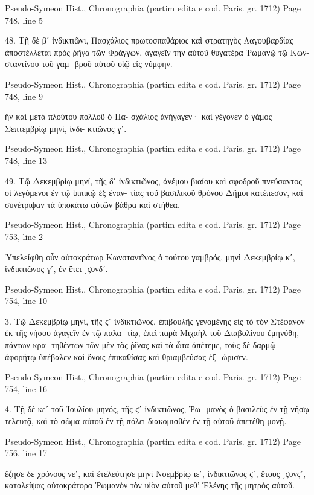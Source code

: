 \documentclass[12pt,letterpaper,twoside,final]{memoir}
\begin{document}
\begin{greek}
Pseudo-Symeon Hist., Chronographia (partim edita e cod. Paris. gr. 1712) 
Page 748, line 5

48. Τῇ δὲ βʹ ἰνδικτιῶνι, Πασχάλιος πρωτοσπαθάριος καὶ 
στρατηγὸς Λαγουβαρδίας ἀποστέλλεται πρὸς ῥῆγα τῶν Φράγγων, 
ἀγαγεῖν τὴν αὐτοῦ θυγατέρα Ῥωμανῷ τῷ Κωνσταντίνου τοῦ γαμ-
βροῦ αὐτοῦ υἱῷ εἰς νύμφην. 



Pseudo-Symeon Hist., Chronographia (partim edita e cod. Paris. gr. 1712) 
Page 748, line 9

                                   ἣν καὶ μετὰ πλούτου πολλοῦ ὁ Πα-
σχάλιος ἀνήγαγεν· καὶ γέγονεν ὁ γάμος Σεπτεμβρίῳ μηνί, ἰνδι-
κτιῶνος γʹ. 



Pseudo-Symeon Hist., Chronographia (partim edita e cod. Paris. gr. 1712) 
Page 748, line 13

49. Τῷ Δεκεμβρίῳ μηνί, τῆς δʹ ἰνδικτιῶνος, ἀνέμου 
βιαίου καὶ σφοδροῦ πνεύσαντος οἱ λεγόμενοι ἐν τῷ ἱππικῷ ἐξ ἐναν-
τίας τοῦ βασιλικοῦ θρόνου Δῆμοι κατέπεσον, καὶ συνέτριψαν τὰ 
ὑποκάτω αὐτῶν βάθρα καὶ στήθεα. 



Pseudo-Symeon Hist., Chronographia (partim edita e cod. Paris. gr. 1712) 
Page 753, line 2

Ὑπελείφθη οὖν αὐτοκράτωρ Κωνσταντῖνος ὁ τούτου γαμβρός, 
μηνὶ Δεκεμβρίῳ κʹ, ἰνδικτιῶνος γʹ, ἐν ἔτει ͵ϛυνδʹ. 



Pseudo-Symeon Hist., Chronographia (partim edita e cod. Paris. gr. 1712) 
Page 754, line 10

3. Τῷ Δεκεμβρίῳ μηνί, τῆς ϛʹ ἰνδικτιῶνος, ἐπιβουλῆς 
γενομένης εἰς τὸ τὸν Στέφανον ἐκ τῆς νήσου ἀγαγεῖν ἐν τῷ παλα-
τίῳ, ἐπεὶ παρὰ Μιχαὴλ τοῦ Διαβολίνου ἐμηνύθη, πάντων κρα-
τηθέντων τῶν μὲν τὰς ῥῖνας καὶ τὰ ὦτα ἀπέτεμε, τοὺς δὲ δαρμῷ 
ἀφορήτῳ ὑπέβαλεν καὶ ὄνοις ἐπικαθίσας καὶ θριαμβεύσας ἐξ-
ώρισεν. 



Pseudo-Symeon Hist., Chronographia (partim edita e cod. Paris. gr. 1712) 
Page 754, line 16

4. Τῇ δὲ κεʹ τοῦ Ἰουλίου μηνός, τῆς ϛʹ ἰνδικτιῶνος, Ῥω-
μανὸς ὁ βασιλεὺς ἐν τῇ νήσῳ τελευτᾷ, καὶ τὸ σῶμα αὐτοῦ ἐν τῇ 
πόλει διακομισθὲν ἐν τῇ αὐτοῦ ἀπετέθη μονῇ. 



Pseudo-Symeon Hist., Chronographia (partim edita e cod. Paris. gr. 1712) 
Page 756, line 17

                                                         ἔζησε δὲ 
χρόνους νεʹ, καὶ ἐτελεύτησε μηνὶ Νοεμβρίῳ ιεʹ, ἰνδικτιῶνος ϛʹ, 
ἔτους ͵ϛυνϛʹ, καταλείψας αὐτοκράτορα Ῥωμανὸν τὸν υἱὸν αὐτοῦ 
μεθ' Ἑλένης τῆς μητρὸς αὐτοῦ. 




\end{greek}
\end{document}
